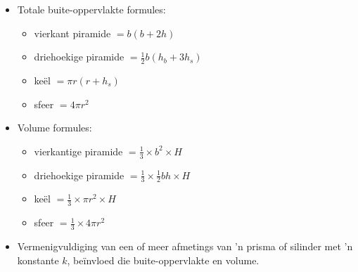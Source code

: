 \begin{itemize}[noitemsep]
\item Totale buite-oppervlakte formules:
\begin{itemize}[noitemsep]
\item vierkant piramide $=b(b+2h)$
\item driehoekige piramide $= \frac{1}{2}b(h_b +3h_s)$
\item keël $= \pi r(r+h_s)$
\item sfeer $= 4\pi r^2$
\end{itemize}
\item Volume formules:
\begin{itemize}[noitemsep]
\item vierkantige piramide $=\frac{1}{3} \times b^2 \times H$
\item driehoekige piramide $= \frac{1}{3} \times \frac{1}{2}bh \times H$
\item keël $= \frac{1}{3} \times \pi r^2 \times H$
\item sfeer $= \frac{1}{3} \times 4\pi r^2$
\end{itemize}
\item Vermenigvuldiging van een of meer afmetings van 'n prisma of silinder met 'n konstante $k$, be\"invloed die buite-oppervlakte en volume.

\clearpage
\begin{eocexercises}{}
\vspace{20pt}


\end{eocexercises}
\end{itemize}
